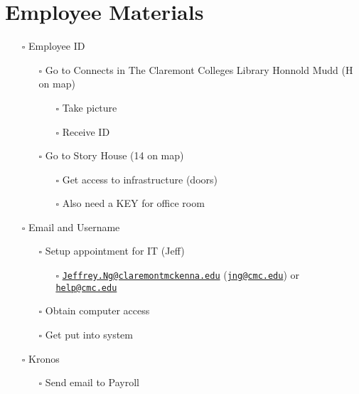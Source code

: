 \documentclass[
]{book}
\providecommand{\tightlist}{%
  \setlength{\itemsep}{0pt}\setlength{\parskip}{0pt}}
\begin{document}
\hypertarget{employee-materials}{%
\chapter{Employee Materials}\label{employee-materials}}

\begin{itemize}
\tightlist
\item[$\square$]
  Employee ID

  \begin{itemize}
  \tightlist
  \item[$\square$]
    Go to Connects in The Claremont Colleges Library Honnold Mudd (H on map)

    \begin{itemize}
    \tightlist
    \item[$\square$]
      Take picture
    \item[$\square$]
      Receive ID
    \end{itemize}
  \item[$\square$]
    Go to Story House (14 on map)

    \begin{itemize}
    \tightlist
    \item[$\square$]
      Get access to infrastructure (doors)
    \item[$\square$]
      Also need a KEY for office room
    \end{itemize}
  \end{itemize}
\item[$\square$]
  Email and Username

  \begin{itemize}
  \tightlist
  \item[$\square$]
    Setup appointment for IT (Jeff)

    \begin{itemize}
    \tightlist
    \item[$\square$]
      \href{mailto:Jeffrey.Ng@claremontmckenna.edu}{\nolinkurl{Jeffrey.Ng@claremontmckenna.edu}} (\href{mailto:jng@cmc.edu}{\nolinkurl{jng@cmc.edu}}) or \href{mailto:help@cmc.edu}{\nolinkurl{help@cmc.edu}}
    \end{itemize}
  \item[$\square$]
    Obtain computer access
  \item[$\square$]
    Get put into system
  \end{itemize}
\item[$\square$]
  Kronos

  \begin{itemize}
  \tightlist
  \item[$\square$]
    Send email to Payroll


\end{itemize}
\end{itemize}
\end{document}
